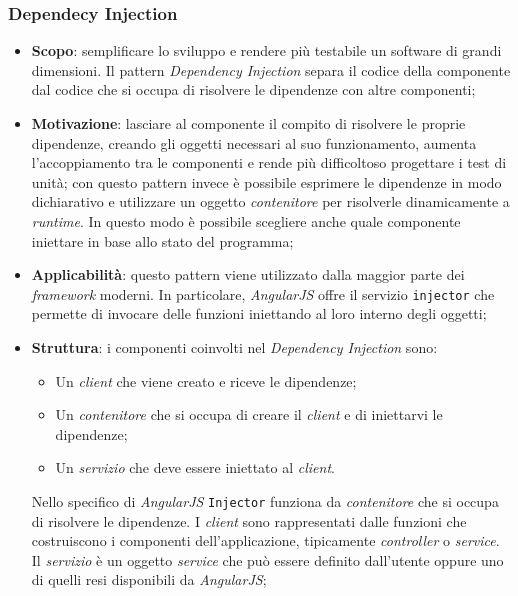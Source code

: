 \subsubsection{Dependecy Injection}
\begin{itemize}

\item \textbf{Scopo}: semplificare lo sviluppo e rendere più testabile un software di grandi dimensioni. Il pattern \textit{Dependency Injection} separa il codice della componente dal codice che si occupa di risolvere le dipendenze con altre componenti;

\item \textbf{Motivazione}: lasciare al componente il compito di risolvere le proprie dipendenze, creando gli oggetti necessari al suo funzionamento, aumenta l'accoppiamento tra le componenti e rende più difficoltoso progettare i test di unità; con questo pattern invece è possibile esprimere le dipendenze in modo dichiarativo e utilizzare un oggetto \textit{contenitore} per risolverle dinamicamente a \textit{runtime}. In questo modo è possibile scegliere anche quale componente iniettare in base allo stato del programma;

\item \textbf{Applicabilità}: questo pattern viene utilizzato dalla maggior parte dei \textit{framework} moderni. In particolare, \textit{AngularJS} offre il servizio
\texttt{injector} che permette di invocare delle funzioni iniettando al loro interno degli oggetti;

\item \textbf{Struttura}: i componenti coinvolti nel \textit{Dependency Injection} sono:
	\begin{itemize}
		\item Un \textit{client} che viene creato e riceve le dipendenze;
		\item Un \textit{contenitore} che si occupa di creare il \textit{client} e di iniettarvi le dipendenze;
		\item Un \textit{servizio} che deve essere iniettato al \textit{client}.
	\end{itemize}
Nello specifico di \textit{AngularJS} \texttt{Injector} funziona da \textit{contenitore} che si occupa di risolvere le dipendenze. I \textit{client} sono rappresentati dalle funzioni che costruiscono i componenti dell'applicazione, tipicamente \textit{controller} o \textit{service}. Il \textit{servizio} è un oggetto \textit{service} che può essere definito dall'utente oppure uno di quelli resi disponibili da \textit{AngularJS};


\end{itemize}
